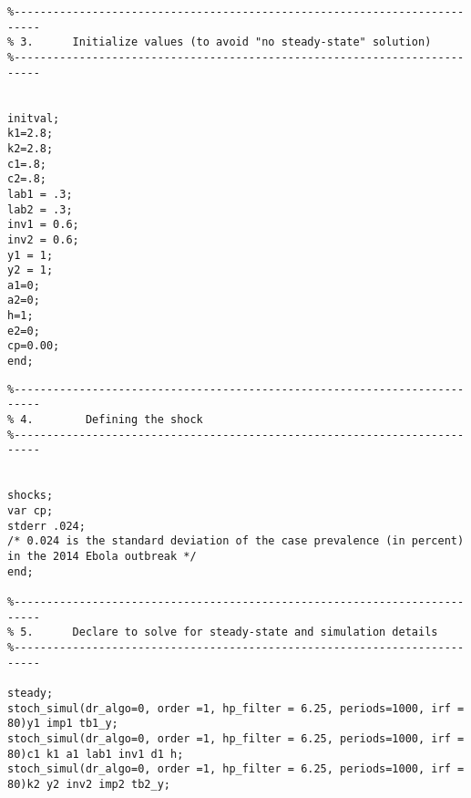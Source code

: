 \documentclass{article}
\begin{document}
\begin{lrbox}{\myv}\begin{minipage}{\textwidth}
\begin{verbatim}
%--------------------------------------------------------------------------
% 3.      Initialize values (to avoid "no steady-state" solution)
%--------------------------------------------------------------------------


initval;
k1=2.8;
k2=2.8;
c1=.8;
c2=.8;
lab1 = .3;
lab2 = .3;
inv1 = 0.6;
inv2 = 0.6;
y1 = 1;
y2 = 1;
a1=0;
a2=0;
h=1;
e2=0;
cp=0.00;
end;

\end{verbatim}
\end{minipage}\end{lrbox}
\resizebox{0.95\textwidth}{!}{\usebox\myv}

\begin{lrbox}{\myv}\begin{minipage}{\textwidth}
\begin{verbatim}
%--------------------------------------------------------------------------
% 4.        Defining the shock
%--------------------------------------------------------------------------


shocks;
var cp;
stderr .024;
/* 0.024 is the standard deviation of the case prevalence (in percent)
in the 2014 Ebola outbreak */
end;

%--------------------------------------------------------------------------
% 5.      Declare to solve for steady-state and simulation details
%--------------------------------------------------------------------------

steady;
stoch_simul(dr_algo=0, order =1, hp_filter = 6.25, periods=1000, irf = 80)y1 imp1 tb1_y;
stoch_simul(dr_algo=0, order =1, hp_filter = 6.25, periods=1000, irf = 80)c1 k1 a1 lab1 inv1 d1 h;
stoch_simul(dr_algo=0, order =1, hp_filter = 6.25, periods=1000, irf = 80)k2 y2 inv2 imp2 tb2_y;

\end{verbatim}
\end{minipage}\end{lrbox}
\resizebox{0.85\textwidth}{!}{\usebox\myv}
\end{document}
